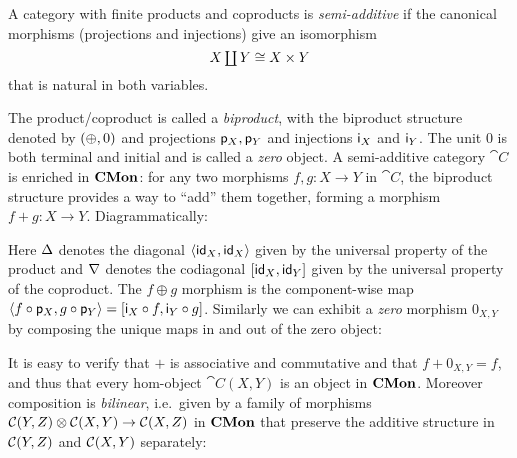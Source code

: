 \begin{definition}
\label{def:biproducts:semi-additive}
A category with finite products and coproducts is \emph{semi-additive} if the canonical morphisms (projections
and injections) give an isomorphism
\[\textstyle X \coprod Y \cong X \times Y\] that is natural in both variables.
\end{definition}

The product/coproduct is called a \emph{biproduct}, with the biproduct structure denoted by $(\oplus, 0)$ and
projections $\mathsf{p}_X, \mathsf{p}_Y$ and injections $\mathsf{i}_X$ and $\mathsf{i}_Y$. The unit $0$ is both terminal and
initial and is called a \emph{zero} object. A semi-additive category $\cat{C}$ is enriched in $\mathbf{CMon}$: for any
two morphisms $f, g: X \to Y$ in $\cat{C}$, the biproduct structure provides a way to ``add'' them together,
forming a morphism $f + g: X \to Y$. Diagrammatically:

\begin{center}
\end{center}

Here $\Delta$ denotes the diagonal $\langle \mathsf{id}_X, \mathsf{id}_X\rangle$ given by the universal property of the product and
$\nabla$ denotes the codiagonal $[\mathsf{id}_X, \mathsf{id}_Y]$ given by the universal property of the coproduct.
The $f \oplus g$ morphism is the component-wise map $\langle f \circ \mathsf{p}_X, g \circ \mathsf{p}_Y\rangle =
[\mathsf{i}_X \circ f, \mathsf{i}_Y \circ g]$. Similarly we can exhibit a \emph{zero} morphism $0_{X,Y}$ by
composing the unique maps in and out of the zero object:

\begin{center}
\end{center}

It is easy to verify that $+$ is associative and commutative and that $f + 0_{X,Y} = f$, and thus that every
hom-object $\cat{C}(X,Y)$ is an object in $\mathbf{CMon}$. Moreover composition is \emph{bilinear}, i.e.~given by a
family of morphisms ${\mathcal{C}}(Y,Z) \otimes {\mathcal{C}}(X,Y) \to {\mathcal{C}}(X,Z)$ in $\mathbf{CMon}$ that
preserve the additive structure in ${\mathcal{C}}(Y,Z)$ and ${\mathcal{C}}(X,Y)$ separately:


